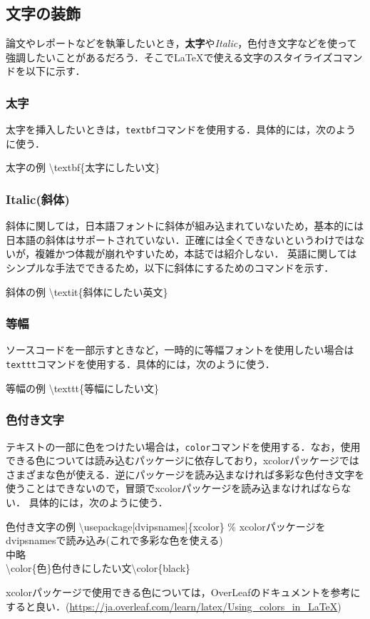 \subsection{文字の装飾}
論文やレポートなどを執筆したいとき，\textbf{太字}や\textit{Italic}，\color{red}色付き文字\color{black}などを使って強調したいことがあるだろう．そこで\LaTeX で使える文字のスタイライズコマンドを以下に示す．
\subsubsection{太字}
太字を挿入したいときは，\texttt{textbf}コマンドを使用する．具体的には，次のように使う．
\begin{itembox}[c]{太字の例}
  \ttfamily
  \textbackslash textbf\{太字にしたい文\}
\end{itembox}
\subsubsection{Italic(斜体)}
斜体に関しては，日本語フォントに斜体が組み込まれていないため，基本的には日本語の斜体はサポートされていない．正確には全くできないというわけではないが，複雑かつ体裁が崩れやすいため，本誌では紹介しない．
英語に関してはシンプルな手法でできるため，以下に斜体にするためのコマンドを示す．
\begin{itembox}[c]{斜体の例}
  \ttfamily
  \textbackslash textit\{斜体にしたい英文\}
\end{itembox}
\subsubsection{等幅}
ソースコードを一部示すときなど，一時的に等幅フォントを使用したい場合は\texttt{texttt}コマンドを使用する．具体的には，次のように使う．
\begin{itembox}[c]{等幅の例}
  \ttfamily
  \textbackslash texttt\{等幅にしたい文\}
\end{itembox}
\subsubsection{色付き文字}
テキストの一部に色をつけたい場合は，\texttt{color}コマンドを使用する．なお，使用できる色については読み込むパッケージに依存しており，xcolorパッケージではさまざまな色が使える．逆にパッケージを読み込まなければ多彩な色付き文字を使うことはできないので，冒頭でxcolorパッケージを読み込まなければならない．
具体的には，次のように使う．
\begin{itembox}[c]{色付き文字の例}
  \ttfamily
  \textbackslash usepackage[dvipsnames]\{xcolor\}
  \% xcolorパッケージをdvipsnamesで読み込み(これで多彩な色を使える)
  \\
  中略
  \\
  \textbackslash color\{色\}色付きにしたい文\textbackslash color\{black\}
\end{itembox}
xcolorパッケージで使用できる色については，OverLeafのドキュメントを参考にすると良い．(\url{https://ja.overleaf.com/learn/latex/Using_colors_in_LaTeX})